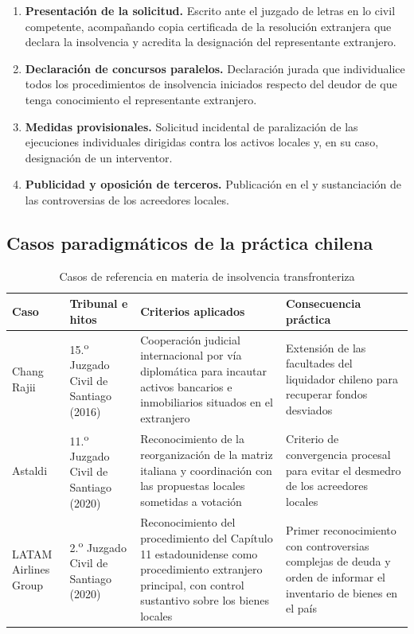 \begin{enumerate}
  \item \textbf{Presentación de la solicitud.} Escrito ante el juzgado de letras en lo
  civil competente, acompañando copia certificada de la resolución extranjera que declara
  la insolvencia y acredita la designación del representante extranjero.

  \item \textbf{Declaración de concursos paralelos.} Declaración jurada que individualice
  todos los procedimientos de insolvencia iniciados respecto del deudor de que tenga
  conocimiento el representante extranjero.

  \item \textbf{Medidas provisionales.} Solicitud incidental de paralización de las
  ejecuciones individuales dirigidas contra los activos locales y, en su caso,
  designación de un interventor.

  \item \textbf{Publicidad y oposición de terceros.} Publicación en el \boletin{} y
  sustanciación de las controversias de los acreedores locales.
\end{enumerate}

\subsection{Casos paradigmáticos de la práctica chilena}

\begin{table}[htbp]
\centering
\small
\caption{Casos de referencia en materia de insolvencia transfronteriza}
\label{tab:cap13-casos}
\begin{tabularx}{\textwidth}{@{}>{\raggedright\arraybackslash}p{} XXX@{}}
\toprule
\textbf{Caso} & \textbf{Tribunal e hitos} & \textbf{Criterios aplicados}
& \textbf{Consecuencia práctica} \\
\midrule
Chang Rajii & 15.\textsuperscript{o} Juzgado Civil de Santiago (2016)
& Cooperación judicial internacional por vía diplomática para incautar activos bancarios
e inmobiliarios situados en el extranjero
& Extensión de las facultades del liquidador chileno para recuperar fondos desviados \\
\addlinespace
Astaldi & 11.\textsuperscript{o} Juzgado Civil de Santiago (2020)
& Reconocimiento de la reorganización de la matriz italiana y coordinación con las
propuestas locales sometidas a votación
& Criterio de convergencia procesal para evitar el desmedro de los acreedores locales \\
\addlinespace
LATAM Airlines Group & 2.\textsuperscript{o} Juzgado Civil de Santiago (2020)
& Reconocimiento del procedimiento del Capítulo 11 estadounidense como procedimiento
extranjero principal, con control sustantivo sobre los bienes locales
& Primer reconocimiento con controversias complejas de deuda y orden de informar el
inventario de bienes en el país \\
\bottomrule
\end{tabularx}
\end{table}

